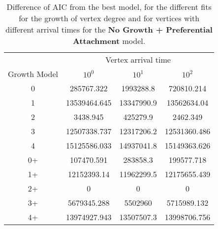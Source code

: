 \begin{table}[H]
\centering
\begin{tabular}{cccc}
                                  & \multicolumn{3}{c}{Vertex arrival time}  \\
\multicolumn{1}{c|}{Growth Model} & $10^0$       & $10^1$     & $10^2$       \\ \hline
\multicolumn{1}{c|}{0}            & 285767.322   & 1993288.8  & 720810.214   \\
\multicolumn{1}{c|}{1}            & 13539464.645 & 13347990.9 & 13562634.04  \\
\multicolumn{1}{c|}{2}            & 3438.945     & 425279.9   & 2462.349     \\
\multicolumn{1}{c|}{3}            & 12507338.737 & 12317206.2 & 12531360.486 \\
\multicolumn{1}{c|}{4}            & 15125586.033 & 14937041.8 & 15149363.626 \\
\multicolumn{1}{c|}{0+}           & 107470.591   & 283858.3   & 199577.718   \\
\multicolumn{1}{c|}{1+}           & 12152393.14  & 11962299.5 & 12175655.439 \\
\multicolumn{1}{c|}{2+}           & 0            & 0          & 0            \\
\multicolumn{1}{c|}{3+}           & 5679345.288  & 5502960    & 5715989.132  \\
\multicolumn{1}{c|}{4+}           & 13974927.943 & 13507507.3 & 13998706.756
\end{tabular}
\caption{Difference of AIC from the best model, for the different fits for the growth of vertex degree and for vertices with different arrival times for the \textbf{No Growth + Preferential Attachment} model.}
\label{tab:NG_evolution_diff}
\end{table}